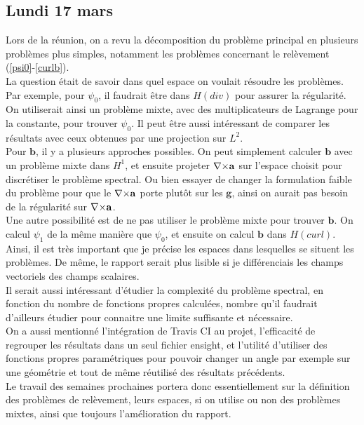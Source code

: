 \subsection{Lundi 17 mars}

Lors de la réunion, on a revu la décomposition du problème principal en plusieurs problèmes plus simples, notamment les problèmes concernant le relèvement (\ref{psi0}-\ref{curlb}).\\
La question était de savoir dans quel espace on voulait résoudre les problèmes. Par exemple, pour $\psi_0$, il faudrait être dans $H(div)$ pour assurer la régularité. On utiliserait ainsi un problème mixte, avec des multiplicateurs de Lagrange pour la constante, pour trouver $\psi_0$. Il peut être aussi intéressant de comparer les résultats avec ceux obtenues par une projection sur $L^2$.\\

Pour $\mathbf{b}$, il y a plusieurs approches possibles. On peut simplement calculer $\mathbf{b}$ avec un problème mixte dans $H^1$, et ensuite projeter ${\nabla\times}\mathbf{a}$ sur l’espace choisit pour discrétiser le problème spectral. Ou bien essayer de changer la formulation faible du problème pour que le ${\nabla\times}\mathbf{a}$ porte plutôt sur les $\mathbf{g}$, ainsi on aurait pas besoin de la  régularité sur ${\nabla\times}\mathbf{a}$.\\
Une autre possibilité est de ne pas utiliser le problème mixte pour trouver $\mathbf{b}$. On calcul $\psi_1$ de la même manière que $\psi_0$, et ensuite on calcul $\mathbf{b}$ dans $H(curl)$.\\

Ainsi, il est très important que je précise les espaces dans lesquelles se situent les problèmes. De même, le rapport serait plus lisible si je différenciais les champs vectoriels des champs scalaires.\\
Il serait aussi intéressant d’étudier la complexité du problème spectral, en fonction du nombre de fonctions propres calculées, nombre qu’il  faudrait d’ailleurs étudier pour connaitre une limite suffisante et nécessaire.\\

On a aussi mentionné l’intégration de Travis CI au projet, l’efficacité de regrouper les résultats dans un seul fichier ensight, et l’utilité d’utiliser des fonctions propres paramétriques pour pouvoir changer un angle par exemple sur une géométrie et tout de même réutilisé des résultats précédents.\\

Le travail des semaines prochaines portera donc essentiellement sur la définition des problèmes de relèvement, leurs espaces, si on utilise ou non des problèmes mixtes, ainsi que toujours l’amélioration du rapport.
